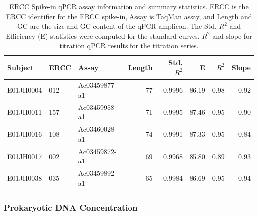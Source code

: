\begin{table}

\caption{\label{tab:erccTable}ERCC Spike-in qPCR assay information and summary statistics. ERCC is the ERCC identifier for the ERCC spike-in, Assay is TaqMan assay, and Length and GC are the size and GC content of the qPCR amplicon.  The Std. $R^2$ and Efficiency (E) statistics were computed for the standard curves. $R^2$ and slope for titration qPCR results for the titration series.}
\centering
\begin{tabular}[t]{lllrrrrr}
\toprule
Subject & ERCC & Assay & Length & Std. $R^2$ & E & $R^2$ & Slope\\
\midrule
E01JH0004 & 012 & Ac03459877-a1 & 77 & 0.9996 & 86.19 & 0.98 & 0.92\\
E01JH0011 & 157 & Ac03459958-a1 & 71 & 0.9995 & 87.46 & 0.95 & 0.90\\
E01JH0016 & 108 & Ac03460028-a1 & 74 & 0.9991 & 87.33 & 0.95 & 0.84\\
E01JH0017 & 002 & Ac03459872-a1 & 69 & 0.9968 & 85.80 & 0.89 & 0.93\\
E01JH0038 & 035 & Ac03459892-a1 & 65 & 0.9984 & 86.69 & 0.95 & 0.94\\
\bottomrule
\end{tabular}
\end{table}


\subsubsection*{Prokaryotic DNA Concentration}

